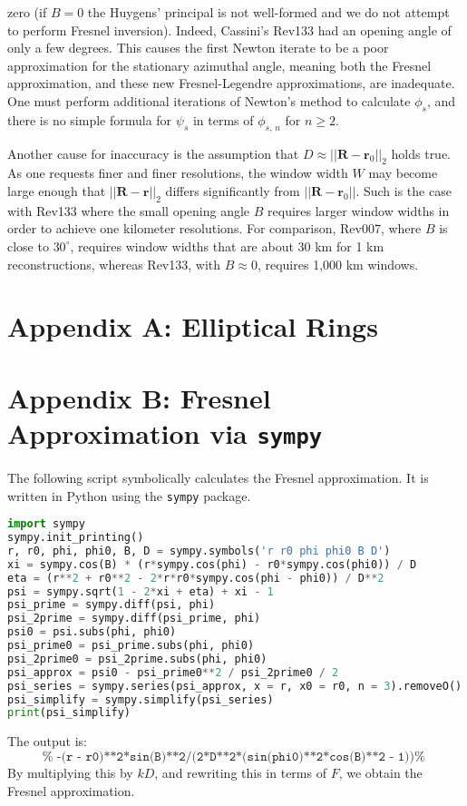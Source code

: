 \documentclass{article}
\begin{document}
        zero (if $B=0$ the Huygens' principal is not well-formed and we do not
        attempt to perform Fresnel inversion). Indeed, Cassini's Rev133 had an
        opening angle of only a few degrees. This causes the first Newton
        iterate to be a poor approximation for the stationary azimuthal angle,
        meaning both the Fresnel approximation, and these new Fresnel-Legendre
        approximations, are inadequate. One must perform additional iterations
        of Newton's method to calculate $\phi_{s}$, and there is no simple
        formula for $\psi_{s}$ in terms of $\phi_{s,\,n}$ for $n\geq{2}$.
        \par\hfill\par
        Another cause for inaccuracy is the assumption that
        $D\approx||\mathbf{R}-\mathbf{r}_{0}||_{2}$ holds true. As one requests
        finer and finer resolutions, the window width $W$ may become large
        enough that $||\mathbf{R}-\mathbf{r}||_{2}$ differs significantly from
        $||\mathbf{R}-\mathbf{r}_{0}||$. Such is the case with Rev133 where the
        small opening angle $B$ requires larger window widths in order to
        achieve one kilometer resolutions. For comparison, Rev007, where $B$ is
        close to $30^{\circ}$, requires window widths that are about 30 km for
        1 km reconstructions, whereas Rev133, with $B\approx{0}$, requires
        1,000 km windows.
    \setcounter{secnumdepth}{0}
    \section{Appendix A: Elliptical Rings}
    \section{Appendix B: Fresnel Approximation via \texttt{sympy}}
        The following script symbolically calculates the Fresnel approximation.
        It is written in Python using the \texttt{sympy} package.
        \begin{lstlisting}[language = Python]
import sympy
sympy.init_printing()
r, r0, phi, phi0, B, D = sympy.symbols('r r0 phi phi0 B D')
xi = sympy.cos(B) * (r*sympy.cos(phi) - r0*sympy.cos(phi0)) / D
eta = (r**2 + r0**2 - 2*r*r0*sympy.cos(phi - phi0)) / D**2
psi = sympy.sqrt(1 - 2*xi + eta) + xi - 1
psi_prime = sympy.diff(psi, phi)
psi_2prime = sympy.diff(psi_prime, phi)
psi0 = psi.subs(phi, phi0)
psi_prime0 = psi_prime.subs(phi, phi0)
psi_2prime0 = psi_2prime.subs(phi, phi0)
psi_approx = psi0 - psi_prime0**2 / psi_2prime0 / 2
psi_series = sympy.series(psi_approx, x = r, x0 = r0, n = 3).removeO()
psi_simplify = sympy.simplify(psi_series)
print(psi_simplify)
        \end{lstlisting}
        The output is:
        \begin{equation}
            \texttt{%
                -(r - r0)**2*sin(B)**2/(2*D**2*(sin(phi0)**2*cos(B)**2 - 1))%
            }
        \end{equation}
        By multiplying this by $kD$, and rewriting this in terms of $F$,
        we obtain the Fresnel approximation.
\end{document}
